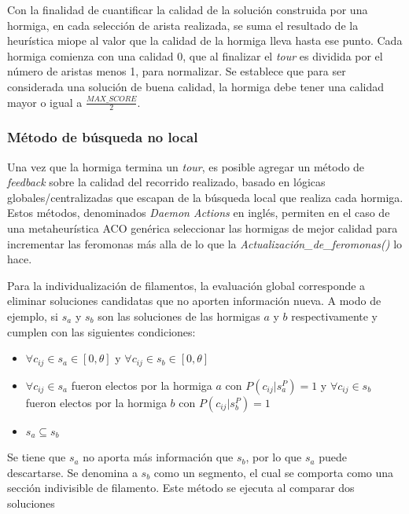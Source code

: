Con la finalidad de cuantificar la calidad de la soluci\'on construida por una hormiga, en cada selecci\'on de arista realizada, se suma el resultado de la heur\'istica miope al valor que la calidad de la hormiga lleva hasta ese punto. Cada hormiga comienza con una calidad 0, que al finalizar el {\it tour} es dividida por el n\'umero de aristas menos 1, para normalizar. Se establece que para ser considerada una soluci\'on de buena calidad, la hormiga debe tener una calidad mayor o igual a $\frac{MAX\_SCORE}{2}$.
    
\subsubsection{M\'etodo de b\'usqueda no local}
Una vez que la hormiga termina un {\it tour}, es posible agregar un m\'etodo de {\it feedback} sobre la calidad del recorrido realizado, basado en l\'ogicas globales/centralizadas que escapan de la b\'usqueda local que realiza cada hormiga. Estos m\'etodos, denominados {\it Daemon Actions} en ingl\'es, permiten en el caso de una metaheur\'istica ACO gen\'erica seleccionar las hormigas de mejor calidad para incrementar las feromonas m\'as alla de lo que la {\it Actualizaci\'on\_de\_feromonas()} lo hace. 

Para la individualizaci\'on de filamentos, la evaluaci\'on global corresponde a eliminar soluciones candidatas que no aporten informaci\'on nueva. A modo de ejemplo, si $s_a$ y $s_b$ son las soluciones de las hormigas $a$ y $b$ respectivamente y cumplen con las siguientes condiciones:

\begin{itemize}
    \item $\forall c_{ij} \in s_a \in [0, \theta]$ y $\forall c_{ij} \in s_b \in [0, \theta]$
    \item $\forall c_{ij} \in s_a$ fueron electos por la hormiga $a$ con $P(c_{ij} | s_{a}^{P}) = 1$ y $\forall c_{ij} \in s_b$ fueron electos por la hormiga $b$ con $P(c_{ij} | s_{b}^{P}) = 1$
    \item $s_a \subseteq s_b$
\end{itemize}

Se tiene que $s_a$ no aporta m\'as informaci\'on que $s_b$, por lo que $s_a$ puede descartarse. Se denomina a $s_b$ como un segmento, el cual se comporta como una secci\'on indivisible de filamento. Este m\'etodo se ejecuta al comparar dos soluciones 

    
